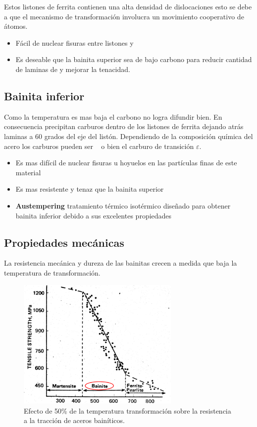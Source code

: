 Estos listones de ferrita contienen una alta densidad de dislocaciones esto se debe a que el mecanismo de transformación involucra un movimiento cooperativo de átomos.
\begin{itemize}
    \item Fácil de nuclear fisuras entre listones y \cementita
    \item Es deseable que la bainita superior sea de bajo carbono para reducir cantidad de laminas de \cementita y mejorar la tenacidad.
\end{itemize}



\subsection{Bainita inferior}
Como la temperatura es mas baja el carbono no logra difundir bien. En consecuencia precipitan carburos dentro de los listones de ferrita dejando atrás laminas a 60 grados del eje del listón. Dependiendo de la composición química del acero los carburos pueden ser \cementita~ o bien el carburo de transición $\varepsilon$.
\begin{itemize}
    \item Es mas difícil de nuclear fisuras u hoyuelos en las partículas finas de este material
    \item Es mas resistente y tenaz que la bainita superior
    \item \textbf{Austempering} tratamiento térmico isotérmico diseñado para obtener bainita inferior debido a sus excelentes propiedades 
\end{itemize}


\subsection{Propiedades mecánicas}
La resistencia mecánica y dureza de las bainitas crecen a medida que baja la temperatura de transformación.

\begin{figure}[htb!]
    \centering
    \includegraphics[width=0.7\textwidth]{fig/RmVsBainitaMartensita.PNG}
    \caption{Efecto de 50\% de la temperatura transformación sobre la resistencia a la tracción de aceros bainíticos.}
    \label{fig:RmVsBainitaMartensita}
\end{figure}

